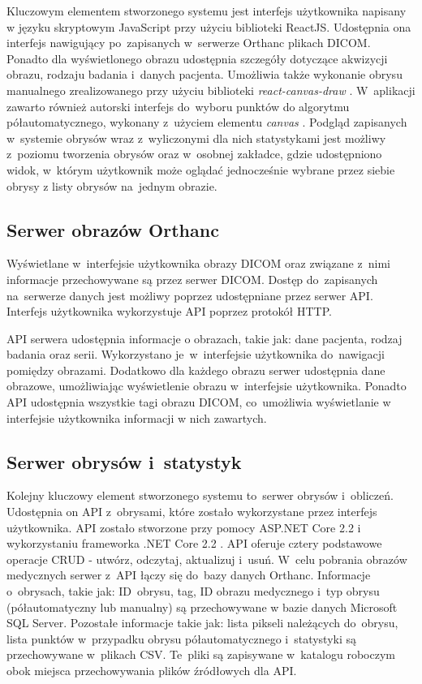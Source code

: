 \documentclass[a4paper,11pt,twoside,openright]{report}
\theoremstyle{definition}
\begin{document}
Kluczowym elementem stworzonego systemu jest interfejs użytkownika napisany w
języku skryptowym JavaScript przy użyciu biblioteki ReactJS. Udostępnia ona
interfejs nawigujący po~zapisanych w~serwerze Orthanc plikach DICOM. Ponadto dla
wyświetlonego obrazu udostępnia szczegóły dotyczące akwizycji obrazu, rodzaju badania i~danych pacjenta.
Umożliwia także wykonanie obrysu manualnego zrealizowanego przy użyciu biblioteki
\textit{react-canvas-draw} \cite{React canvas draw}. W~aplikacji zawarto również autorski interfejs do~wyboru punktów
do algorytmu półautomatycznego, wykonany z~użyciem elementu \textit{canvas} \cite{Canvas}.
Podgląd zapisanych w~systemie obrysów wraz z~wyliczonymi dla nich statystykami
jest możliwy z~poziomu tworzenia obrysów oraz w~osobnej zakładce, gdzie udostępniono
widok, w~którym użytkownik może oglądać jednocześnie wybrane przez siebie obrysy
z listy obrysów na~jednym obrazie.

\subsection {Serwer obrazów Orthanc}

Wyświetlane w~interfejsie użytkownika obrazy DICOM oraz związane z~nimi informacje
przechowywane są przez serwer DICOM. Dostęp do~zapisanych na~serwerze danych jest
możliwy poprzez udostępniane przez serwer API. Interfejs użytkownika wykorzystuje
API poprzez protokół HTTP.

API serwera udostępnia informacje o obrazach, takie jak: dane pacjenta,
rodzaj badania oraz serii. Wykorzystano je~w~interfejsie użytkownika do~nawigacji pomiędzy
obrazami. Dodatkowo dla każdego obrazu serwer udostępnia dane obrazowe, umożliwiając
wyświetlenie obrazu w~interfejsie użytkownika. Ponadto API udostępnia wszystkie
tagi obrazu DICOM, co~umożliwia wyświetlanie w interfejsie użytkownika informacji
w nich zawartych.

\subsection {Serwer obrysów i~statystyk}
Kolejny kluczowy element stworzonego systemu to~serwer obrysów i~obliczeń. Udostępnia
on API z~obrysami, które zostało wykorzystane przez interfejs użytkownika. API zostało
stworzone przy pomocy ASP.NET Core 2.2 \cite{ASPNET} i wykorzystaniu frameworka
.NET Core 2.2 \cite{Charakterystyka dotnet}. API oferuje cztery podstawowe operacje CRUD
- utwórz, odczytaj, aktualizuj i~usuń. W~celu pobrania obrazów medycznych serwer z~API
łączy się do~bazy danych Orthanc. Informacje o~obrysach, takie jak: ID~obrysu, tag,
ID obrazu medycznego i~typ obrysu (półautomatyczny lub manualny) są przechowywane
w bazie danych Microsoft SQL Server. Pozostałe informacje takie jak: lista pikseli
należących do~obrysu, lista punktów w~przypadku obrysu półautomatycznego i~statystyki
są przechowywane w~plikach CSV. Te~pliki są zapisywane w~katalogu roboczym obok
miejsca przechowywania plików źródłowych dla API.
\end{document}

